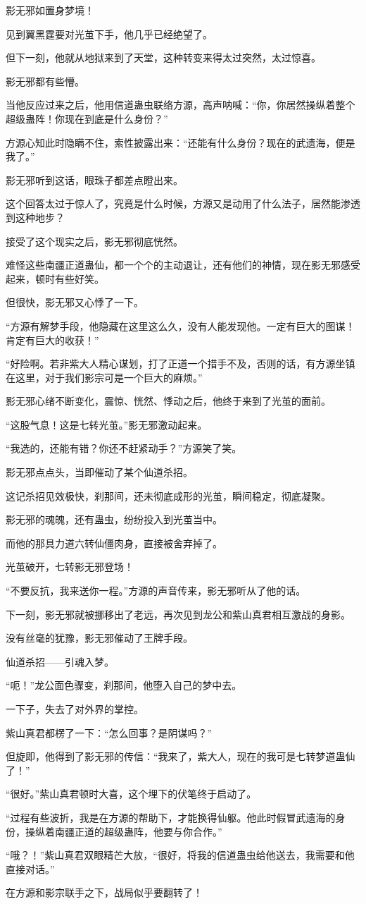 \begin{this_body}
影无邪如置身梦境！

见到翼黑霆要对光茧下手，他几乎已经绝望了。

但下一刻，他就从地狱来到了天堂，这种转变来得太过突然，太过惊喜。

影无邪都有些懵。

当他反应过来之后，他用信道蛊虫联络方源，高声呐喊：“你，你居然操纵着整个超级蛊阵！你现在到底是什么身份？”

方源心知此时隐瞒不住，索性披露出来：“还能有什么身份？现在的武遗海，便是我了。”

影无邪听到这话，眼珠子都差点瞪出来。

这个回答太过于惊人了，究竟是什么时候，方源又是动用了什么法子，居然能渗透到这种地步？

接受了这个现实之后，影无邪彻底恍然。

难怪这些南疆正道蛊仙，都一个个的主动退让，还有他们的神情，现在影无邪感受起来，顿时有些好笑。

但很快，影无邪又心悸了一下。

“方源有解梦手段，他隐藏在这里这么久，没有人能发现他。一定有巨大的图谋！肯定有巨大的收获！”

“好险啊。若非紫大人精心谋划，打了正道一个措手不及，否则的话，有方源坐镇在这里，对于我们影宗可是一个巨大的麻烦。”

影无邪心绪不断变化，震惊、恍然、悸动之后，他终于来到了光茧的面前。

“这股气息！这是七转光茧。”影无邪激动起来。

“我选的，还能有错？你还不赶紧动手？”方源笑了笑。

影无邪点点头，当即催动了某个仙道杀招。

这记杀招见效极快，刹那间，还未彻底成形的光茧，瞬间稳定，彻底凝聚。

影无邪的魂魄，还有蛊虫，纷纷投入到光茧当中。

而他的那具力道六转仙僵肉身，直接被舍弃掉了。

光茧破开，七转影无邪登场！

“不要反抗，我来送你一程。”方源的声音传来，影无邪听从了他的话。

下一刻，影无邪就被挪移出了老远，再次见到龙公和紫山真君相互激战的身影。

没有丝毫的犹豫，影无邪催动了王牌手段。

仙道杀招——引魂入梦。

“呃！”龙公面色骤变，刹那间，他堕入自己的梦中去。

一下子，失去了对外界的掌控。

紫山真君都楞了一下：“怎么回事？是阴谋吗？”

但旋即，他得到了影无邪的传信：“我来了，紫大人，现在的我可是七转梦道蛊仙了！”

“很好。”紫山真君顿时大喜，这个埋下的伏笔终于启动了。

“过程有些波折，我是在方源的帮助下，才能换得仙躯。他此时假冒武遗海的身份，操纵着南疆正道的超级蛊阵，他要与你合作。”

“哦？！”紫山真君双眼精芒大放，“很好，将我的信道蛊虫给他送去，我需要和他直接对话。”

在方源和影宗联手之下，战局似乎要翻转了！

\end{this_body}


